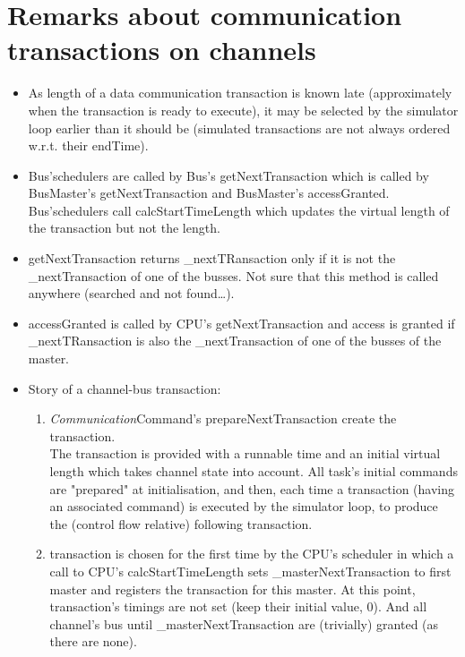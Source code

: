 \documentclass[a4paper,11pt]{article}
\newcommand{\cod}[1]{{\ttfamily #1}}
\begin{document}
\section*{Remarks about communication transactions on channels}
\begin{itemize}
	\item As length of a data communication transaction is known late (approximately when the transaction is ready to execute), it may be selected by the simulator loop earlier than it should be (simulated transactions are not always ordered w.r.t. their endTime).
	\item \cod{Bus}'schedulers are called by \cod{Bus}'s \cod{getNextTransaction} which is called by \cod{BusMas\-ter}'s \cod{getNextTransaction} and \cod{BusMaster}'s \cod{accessGranted}.\\
	\cod{Bus}'schedulers call \cod{calcStartTimeLength} which updates the virtual length of the transaction but not the length.
	\item \cod{getNextTransaction} returns \cod{\_nextTRansaction} only if it is not the \cod{\_next\-Trans\-ac\-tion} of one of the busses. Not sure that this method is called anywhere (searched and not found\ldots).
	\item \cod{accessGranted} is called by CPU's \cod{getNextTransaction} and access is granted if \cod{\_nextTRansaction} is also the \cod{\_nextTransaction} of one of the busses of the master.
	\item Story of a channel-bus transaction:
	  \begin{enumerate}
	  	\item \cod{\textit{Communication}Command}'s \cod{prepareNextTransaction} create the transaction.\\ The transaction is provided  with a runnable time and an initial virtual length which takes channel state into account. All task's initial commands are "prepared" at initialisation, and then, each time a transaction (having an associated command) is executed by the simulator loop, to produce the (control flow relative) following transaction.
	  	\item transaction is chosen for the first time by the \cod{CPU}'s scheduler in which a call to
	  	\cod{CPU}'s \cod{calcStartTimeLength} sets \cod{\_masterNextTransaction} to first master and registers the transaction for this master. At this point, transaction's timings are not set (keep their initial value, 0). And all channel's bus  until \cod{\_masterNextTrans\-action} are (trivially) granted (as there are none).

\end{enumerate}
\end{itemize}
\end{document}
